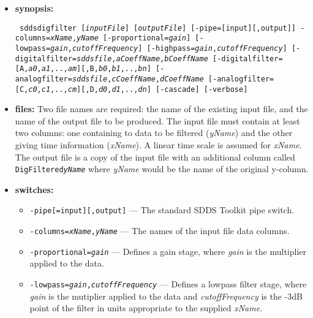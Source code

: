 \begin{itemize}
  \begin{flushleft}{\tt
  sddsdigfilter data.wf -col=time,value result.wf -analog=D,1.0,0.01,C,0.1,0.3,1.6
  }\end{flushleft}

  Five-sample digital delay:

  \begin{flushleft}{\tt
  sddsdigfilter data.wf -col=time,value result.wf -digital=B,0,0,0,0,0,1
  }\end{flushleft}
 
\item {\bf synopsis:} 
\begin{flushleft}{\tt
sddsdigfilter [{\em inputFile}] [{\em outputFile}] [-pipe=[input][,output]]
  -columns={\em xName},{\em yName}
 [-proportional={\em gain}]
 [-lowpass={\em gain},{\em cutoffFrequency}]
 [-highpass={\em gain},{\em cutoffFrequency}]
 [-digitalfilter={\em sddsfile},{\em aCoeffName},{\em bCoeffName}
 [-digitalfilter=[A,{\em a0},{\em a1},..,{\em am}][,B,{\em b0},{\em b1},..,{\em bn}]
 [-analogfilter={\em sddsfile},{\em cCoeffName},{\em dCoeffName}
 [-analogfilter=[C,{\em c0},{\em c1},..,{\em cm}][,D,{\em d0},{\em d1},..,{\em dn}]
 [-cascade]
 [-verbose]

}\end{flushleft}
\item {\bf files:}
 Two file names are required: the name of the existing input file,
 and the name of the output file to be produced. The input file must
 contain at least two columns: one containing to data to be filtered
 ({\em yName}) and the other giving time information ({\em xName}). A linear time
 scale is assumed for {\em xName}.
 The output file is a copy of the input file with an additional column
 called {\tt DigFiltered{\em yName}} where {\em yName} would be the name of the
 original y-column.

\item {\bf switches:}
%
%
    \begin{itemize}

   \item {\tt -pipe[=input][,output]} --- The standard SDDS Toolkit pipe switch.
   \item {\tt -columns={\em xName},{\em yName}} --- The names of the input file data columns.
   \item {\tt -proportional={\em gain}} --- Defines a gain stage, where {\em gain} is the multiplier applied to the data.

   \item {\tt -lowpass={\em gain},{\em cutoffFrequency}} --- Defines a lowpass filter stage, where
{\em gain} is the mutiplier applied to the data and {\em cutoffFrequency} is the -3dB point of the
filter in units appropriate to the supplied {\em xName}.


\end{itemize}
\end{itemize}
